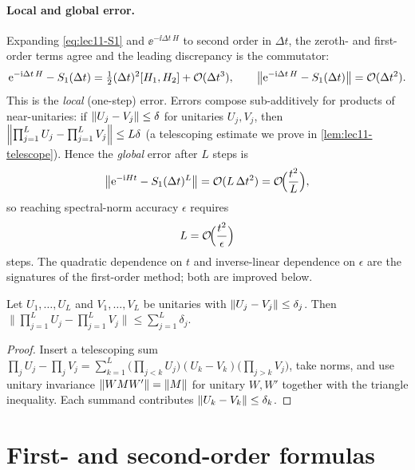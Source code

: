 \paragraph{Local and global error.}
Expanding \eqref{eq:lec11-S1} and $\ee^{-\ii\Delta t\,H}$ to second order in $\Delta t$,
the zeroth- and first-order terms agree and the leading discrepancy is the commutator:
\begin{equation}
  \mathrm{e}^{-\mathrm{i}\Delta t\,H}-S_1(\Delta t)
  =\tfrac12(\Delta t)^2[H_1,H_2]+\mathcal{O}(\Delta t^3),
  \qquad
  \left\lVert \mathrm{e}^{-\mathrm{i}\Delta t\,H}-S_1(\Delta t) \right\rVert=\mathcal{O}(\Delta t^2).
  \label{eq:lec11-S1-local}
\end{equation}
This is the \emph{local} (one-step) error. Errors compose sub-additively for products of
near-unitaries: if $\left\lVert U_j-V_j \right\rVert\le\delta$ for unitaries $U_j,V_j$, then
$\left\lVert \prod_{j=1}^{L}U_j-\prod_{j=1}^{L}V_j \right\rVert\le L\delta$ (a telescoping estimate we prove
in \cref{lem:lec11-telescope}). Hence the \emph{global} error after $L$ steps is
\begin{equation}
  \left\lVert \mathrm{e}^{-\mathrm{i} Ht}-S_1(\Delta t)^L \right\rVert
  =\mathcal{O}(L\,\Delta t^2)=\mathcal{O}\!\Bigl(\frac{t^2}{L}\Bigr),
  \label{eq:lec11-S1-global}
\end{equation}
so reaching spectral-norm accuracy $\epsilon$ requires
\begin{equation}
  L=\mathcal{O}\!\Bigl(\frac{t^2}{\epsilon}\Bigr)
  \label{eq:lec11-S1-L}
\end{equation}
steps. The quadratic dependence on $t$ and inverse-linear dependence on $\epsilon$ are the
signatures of the first-order method; both are improved below.

\begin{lemma}
\label{lem:lec11-telescope}
Let $U_1,\dots,U_L$ and $V_1,\dots,V_L$ be unitaries with
$\left\lVert U_j-V_j \right\rVert\le\delta_j$. Then
$\bigl\|\prod_{j=1}^{L}U_j-\prod_{j=1}^{L}V_j\bigr\|\le\sum_{j=1}^{L}\delta_j$.
\end{lemma}

\begin{proof}
Insert a telescoping sum
$\prod_j U_j-\prod_j V_j
=\sum_{k=1}^{L}\bigl(\prod_{j<k}U_j\bigr)(U_k-V_k)\bigl(\prod_{j>k}V_j\bigr)$,
take norms, and use unitary invariance $\left\lVert WMW' \right\rVert=\left\lVert M \right\rVert$ for unitary $W,W'$ together
with the triangle inequality. Each summand contributes $\left\lVert U_k-V_k \right\rVert\le\delta_k$.
\end{proof}

\section{First- and second-order formulas}
\label{sec:lec11-2}

